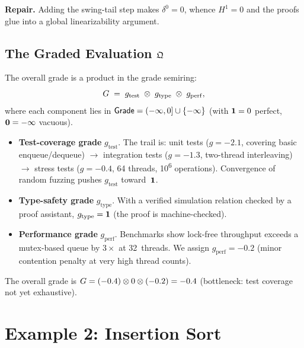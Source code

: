 \textbf{Repair.}\quad
Adding the swing-tail step makes $\delta^0=0$, whence
$H^1=0$ and the proofs glue into a global linearizability argument.

\subsection{The Graded Evaluation $\mathfrak{Q}$}

\begin{construction}
\label{con:verif-grade}
The overall grade is a product in the grade semiring:
\[
  G
  \;=\;
  g_{\mathrm{test}} \;\otimes\; g_{\mathrm{type}} \;\otimes\; g_{\mathrm{perf}},
\]
where each component lies in $\mathsf{Grade}=(-\infty,0]\cup\{-\infty\}$
(with $\mathbf{1}=0$ perfect, $\mathbf{0}=-\infty$ vacuous).
\end{construction}

\begin{itemize}[nosep]
  \item \textbf{Test-coverage grade} $g_{\mathrm{test}}$.
    The trail is: unit tests ($g=-2.1$, covering basic enqueue/dequeue)
    $\to$ integration tests ($g=-1.3$, two-thread interleaving)
    $\to$ stress tests ($g=-0.4$, 64 threads, 10\textsuperscript{6}
    operations).  Convergence of random fuzzing pushes $g_{\mathrm{test}}$
    toward~$\mathbf{1}$.

  \item \textbf{Type-safety grade} $g_{\mathrm{type}}$.
    With a verified simulation relation checked by a proof assistant,
    $g_{\mathrm{type}}=\mathbf{1}$ (the proof is machine-checked).

  \item \textbf{Performance grade} $g_{\mathrm{perf}}$.
    Benchmarks show lock-free throughput exceeds a mutex-based queue
    by $3\times$ at 32~threads.  We assign $g_{\mathrm{perf}}=-0.2$
    (minor contention penalty at very high thread counts).
\end{itemize}

The overall grade is
$G = (-0.4)\otimes 0 \otimes (-0.2) = -0.4$
(bottleneck: test coverage not yet exhaustive).

\medskip

\section{Example 2: Insertion Sort}
\label{sec:isort}

